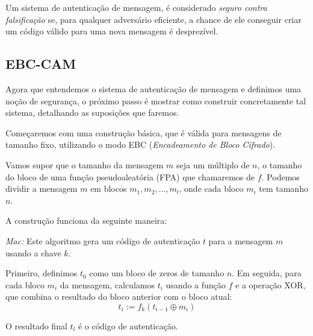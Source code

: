 \begin{center}
\end{center}

Um sistema de autenticação de mensagem, é considerado {\em seguro contra falsificação} se, para qualquer adversário eficiente, a chance de ele conseguir criar um código válido para uma nova mensagem é desprezível.

\subsection{EBC-CAM}
\label{sec:cbc-mac}

Agora que entendemos o sistema de autenticação de mensagem e definimos uma noção de segurança, o próximo passo é mostrar como construir concretamente tal sistema, detalhando as suposições que faremos.

Começaremos com uma construção básica, que é válida para mensagens de tamanho fixo, utilizando o modo EBC ({\em Encadeamento de Bloco Cifrado}).

Vamos supor que o tamanho da mensagem $m$ seja um múltiplo de $n$, o tamanho do bloco de uma função pseudoaleatória (FPA) que chamaremos de $f$.
Podemos dividir a mensagem $m$ em blocos $m_1, m_2, \dots, m_l$, onde cada bloco $m_i$ tem tamanho $n$.

A construção funciona da seguinte maneira:

{\em Mac:} Este algoritmo gera um código de autenticação $t$ para a mensagem $m$ usando a chave $k$.

Primeiro, definimos $t_0$ como um bloco de zeros de tamanho $n$.
Em seguida, para cada bloco $m_i$ da mensagem, calculamos $t_i$ usando a função $f$ e a operação XOR, que combina o resultado do bloco anterior com o bloco atual:
\begin{displaymath}
t_i := f_k(t_{i-1} \oplus m_i)
\end{displaymath}

O resultado final $t_l$ é o código de autenticação.

